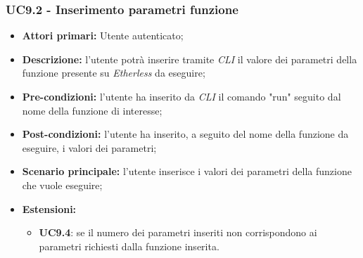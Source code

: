 \subsubsection{UC9.2 - Inserimento parametri funzione}
\begin{itemize}
	\item \textbf{Attori primari:} Utente autenticato;
	\item \textbf{Descrizione:} l'utente potrà inserire tramite \textit{CLI} il valore dei parametri della funzione presente su \textit{Etherless} da eseguire; 
	\item \textbf{Pre-condizioni:} l'utente ha inserito da \textit{CLI\glo} il comando "run" seguito dal nome della funzione di interesse;
	\item \textbf{Post-condizioni:} l'utente ha inserito, a seguito del nome della funzione da eseguire, i valori dei parametri;
	\item \textbf{Scenario principale:} l'utente inserisce i valori dei parametri della funzione che vuole eseguire;
	\item \textbf{Estensioni:} 
	\begin{itemize}
		\item \textbf{UC9.4}: se il numero dei parametri inseriti non corrispondono ai parametri richiesti dalla funzione inserita.
	\end{itemize}
\end{itemize}